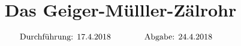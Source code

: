 

\subject{V703}
\title{Das Geiger-Mülller-Zälrohr}

\date{
  \begin{align}
    \text{Durchführung: } & \text{17.4.2018} & \hspace{3em} & \text{Abgabe: 24.4.2018} \notag
  \end{align}
}




\maketitle
\thispagestyle{empty}
\tableofcontents
\newpage






\nocite{*}
\printbibliography{}



